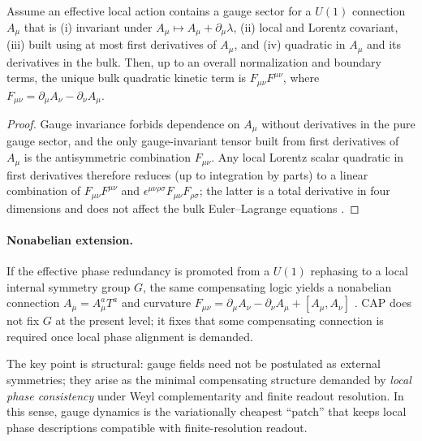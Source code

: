 \begin{proposition}
\label{prop:gauge_rigidity}
Assume an effective local action contains a gauge sector for a $U(1)$ connection $A_\mu$ that is (i) invariant under $A_\mu\mapsto A_\mu+\partial_\mu\lambda$, (ii) local and Lorentz covariant, (iii) built using at most first derivatives of $A_\mu$, and (iv) quadratic in $A_\mu$ and its derivatives in the bulk. Then, up to an overall normalization and boundary terms, the unique bulk quadratic kinetic term is $F_{\mu\nu}F^{\mu\nu}$, where $F_{\mu\nu}=\partial_\mu A_\nu-\partial_\nu A_\mu$.
\end{proposition}
\begin{proof}
Gauge invariance forbids dependence on $A_\mu$ without derivatives in the pure gauge sector, and the only gauge-invariant tensor built from first derivatives of $A_\mu$ is the antisymmetric combination $F_{\mu\nu}$. Any local Lorentz scalar quadratic in first derivatives therefore reduces (up to integration by parts) to a linear combination of $F_{\mu\nu}F^{\mu\nu}$ and $\epsilon^{\mu\nu\rho\sigma}F_{\mu\nu}F_{\rho\sigma}$; the latter is a total derivative in four dimensions and does not affect the bulk Euler--Lagrange equations \cite{PeskinSchroeder1995,Nakahara2003}.
\end{proof}

\paragraph{Nonabelian extension.}
If the effective phase redundancy is promoted from a $U(1)$ rephasing to a local internal symmetry group $G$, the same compensating logic yields a nonabelian connection $A_\mu=A_\mu^a T^a$ and curvature $F_{\mu\nu}=\partial_\mu A_\nu-\partial_\nu A_\mu+[A_\mu,A_\nu]$ \cite{Nakahara2003}. CAP does not fix $G$ at the present level; it fixes that some compensating connection is required once local phase alignment is demanded.

\noindent The key point is structural: gauge fields need not be postulated as external symmetries; they arise as the minimal compensating structure demanded by \emph{local phase consistency} under Weyl complementarity and finite readout resolution. In this sense, gauge dynamics is the variationally cheapest ``patch'' that keeps local phase descriptions compatible with finite-resolution readout.


